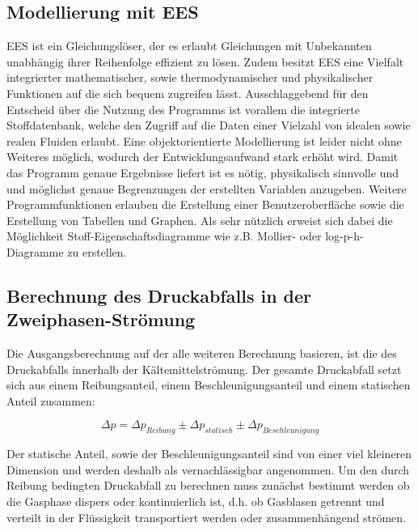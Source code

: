 \subsection{Modellierung mit EES}
\label{subsec:Modellierung mit EES}

EES ist ein Gleichungslöser, der es erlaubt Gleichungen mit Unbekannten unabhängig ihrer Reihenfolge effizient zu lösen. Zudem besitzt EES eine Vielfalt integrierter mathematischer, sowie thermodynamischer und physikalischer Funktionen auf die sich bequem zugreifen lässt\cite{Klein.2000}. Ausschlaggebend für den Entscheid über die Nutzung des Programms ist vorallem die integrierte Stoffdatenbank, welche den Zugriff auf die Daten einer Vielzahl von idealen sowie realen Fluiden erlaubt. Eine objektorientierte Modellierung ist leider nicht ohne Weiteres möglich, wodurch der Entwicklungsaufwand stark erhöht wird. Damit das Programm genaue Ergebnisse liefert ist es nötig, physikalisch sinnvolle und und möglichst genaue Begrenzungen der erstellten Variablen anzugeben. 
Weitere Programmfunktionen erlauben die Erstellung einer Benutzeroberfläche sowie die Erstellung von Tabellen und Graphen. Als sehr nützlich erweist sich dabei die Möglichkeit Stoff-Eigenschaftsdiagramme wie z.B. Mollier- oder log-p-h-Diagramme zu erstellen.



\subsection{Berechnung des Druckabfalls in der Zweiphasen-Strömung}
\label{subsec:Berechnung des Druckabfalls in der Zweiphasen-Strömung}

Die Ausgangsberechnung auf der alle weiteren Berechnung basieren, ist die des Druckabfalls innerhalb der Kältemittelströmung.
Der gesamte Druckabfall setzt sich aus einem Reibungsanteil, einem Beschleunigungsanteil und einem statischen Anteil zusammen\cite{SpringerVerlagGmbH.2013}:

\begin{equation}
\Delta p =  \Delta p_{Reibung} \pm \Delta p_{statisch} \pm \Delta p_{Beschleunigung}
\end{equation}

Der statische Anteil, sowie der Beschleunigungsanteil sind von einer viel kleineren Dimension und werden deshalb als vernachlässigbar angenommen. Um den durch Reibung bedingten Druckabfall zu berechnen muss zunächst bestimmt werden ob die Gasphase dispers oder kontinuierlich ist, d.h. ob Gasblasen getrennt und verteilt in der Flüssigkeit transportiert werden oder zusammenhängend strömen.

